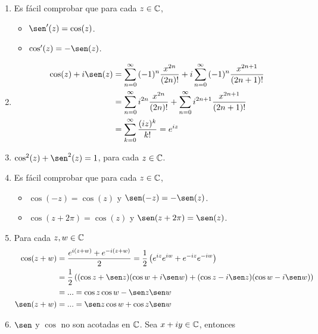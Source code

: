 \begin{enumerate}
    \item Es fácil comprobar que para cada $z \in \mathbb{C}$,
          \begin{itemize}
              \item $\sen'(z) = \cos(z)$.
              \item $\cos'(z) = -\sen(z)$.
          \end{itemize}
    \item
          \begin{align*}
              \cos(z) + i\sen(z) & = \sum_{n=0}^{\infty}{(-1)^n\frac{x^{2n}}{(2n)!}} + i\sum_{n=0}^{\infty}{(-1)^n\frac{x^{2n+1}}{(2n+1)!}}  \\
                                 & = \sum_{n=0}^{\infty}{i^{2n}\frac{x^{2n}}{(2n)!}} + \sum_{n=0}^{\infty}{i^{2n+1}\frac{x^{2n+1}}{(2n+1)!}} \\
                                 & = \sum_{k=0}^{\infty}{\frac{(iz)^k}{k!}} = e^{iz}
          \end{align*}
    \item $\cos^2(z) + \sen^2(z) = 1$, para cada $z \in \mathbb{C}$.
    \item Es fácil comprobar que para cada $z \in \mathbb{C}$,
          \begin{itemize}
              \item $\cos(-z) = \cos(z)$ y $\sen(-z) = -\sen(z)$.
              \item $\cos(z + 2\pi) = \cos(z)$ y $\sen(z +2\pi) = \sen(z)$.
          \end{itemize}
    \item Para cada $z,w \in \mathbb{C}$
          \begin{align*}
              \cos(z+w) & = \frac{e^{i(z+w)} + e^{-i(z+w)}}{2} = \frac{1}{2}\left( e^{iz}e^{iw} + e^{-iz}e^{-iw}\right)        \\
                        & = \frac{1}{2}\left( (\cos z + \sen z)(\cos w + i\sen w) + (\cos z -i\sen z)(\cos w - i\sen w)\right) \\
                        & = ... = \cos z \cos w - \sen z \sen w                                                                \\
              \sen(z+w) & = ... = \sen z \cos w + \cos z \sen w
          \end{align*}
    \item $\sen$ y $\cos$ no son acotadas en $\mathbb{C}$. Sea $x + iy \in \mathbb{C}$, entonces
          \begin{align*}

\end{align*}
\end{enumerate}
